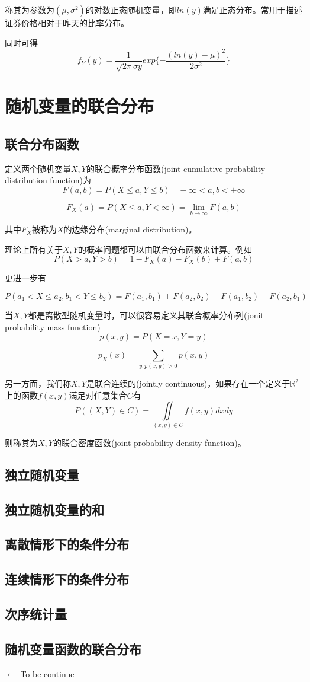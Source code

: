\documentclass[UTF8]{ctexart}
\begin{document}
称其为参数为$(\mu ,\sigma^{2}) $的对数正态随机变量，即$ln(y)$满足正态分布。常用于描述证券价格相对于昨天的比率分布。

同时可得
$$f_{Y}(y)=\displaystyle\frac{1}{\sqrt{2\pi } \sigma y}exp\{-\frac{(ln(y)-\mu )^{2}}{2\sigma^{2}}\} $$

\newpage

\section{随机变量的联合分布}

\subsection{联合分布函数}

定义两个随机变量$X,Y$的联合概率分布函数(joint cumulative probability distribution function)为
$$F(a,b)=P(X\leq a,Y\leq b)\quad -\infty <a,b<+\infty $$

$$F_{X}(a)=P(X\leq a,Y<\infty)=\lim_{b\to \infty}F(a,b) $$

其中$F_{X}$被称为$X$的边缘分布(marginal distribution)。

理论上所有关于$X,Y$的概率问题都可以由联合分布函数来计算。例如
$$P(X>a,Y>b)=1-F_{X}(a)-F_{X}(b)+F(a,b) $$

更进一步有

$$P(a_{1}<X\leq a_{2},b_{1}<Y\leq b_{2})=F(a_{1},b_{1})+F(a_{2},b_{2})-F(a_{1},b_{2})-F(a_{2},b_{1}) $$

当$X,Y$都是离散型随机变量时，可以很容易定义其联合概率分布列(jonit probability mass function)
$$p(x,y)=P(X=x,Y=y)$$

$$p_{X}(x)=\sum_{y:p(x,y)>0}p(x,y) $$

另一方面，我们称$X,Y$是联合连续的(jointly continuous)，如果存在一个定义于$\mathbb{R}^{2}$上的函数$f(x,y)$满足对任意集合$C$有
$$P((X,Y)\in C)=\iint\limits_{(x,y)\in C} f(x,y)dxdy $$

则称其为$X,Y$的联合密度函数(joint probability density function)。



\subsection{独立随机变量}

\subsection{独立随机变量的和}

\subsection{离散情形下的条件分布}

\subsection{连续情形下的条件分布}

\subsection{次序统计量}

\subsection{随机变量函数的联合分布}

$\gets$ To be continue
\end{document}
